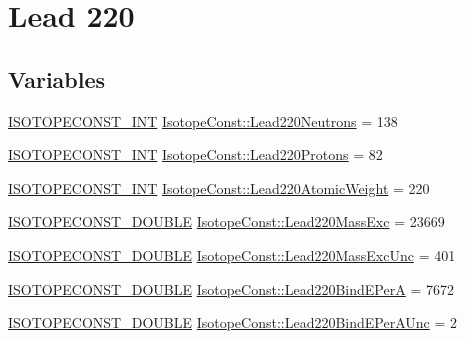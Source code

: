 \hypertarget{group___isotope_const-_lead-_pb220}{}\section{Lead 220}
\label{group___isotope_const-_lead-_pb220}
\subsection*{Variables}
\begin{DoxyCompactItemize}
\item 
\mbox{\hyperlink{group___isotope_const-_macros_ga5f18360b3e99483a35c32d789e62621c}{I\+S\+O\+T\+O\+P\+E\+C\+O\+N\+S\+T\+\_\+\+I\+NT}} \mbox{\hyperlink{group___isotope_const-_lead-_pb220_gae9c7e654f02408f6508fe747a081cbbb}{Isotope\+Const\+::\+Lead220\+Neutrons}} = 138
\item 
\mbox{\hyperlink{group___isotope_const-_macros_ga5f18360b3e99483a35c32d789e62621c}{I\+S\+O\+T\+O\+P\+E\+C\+O\+N\+S\+T\+\_\+\+I\+NT}} \mbox{\hyperlink{group___isotope_const-_lead-_pb220_ga0b3c0adc6d6d3987992f385495edb90f}{Isotope\+Const\+::\+Lead220\+Protons}} = 82
\item 
\mbox{\hyperlink{group___isotope_const-_macros_ga5f18360b3e99483a35c32d789e62621c}{I\+S\+O\+T\+O\+P\+E\+C\+O\+N\+S\+T\+\_\+\+I\+NT}} \mbox{\hyperlink{group___isotope_const-_lead-_pb220_ga8ca47f87e83d5139afb126f253a26346}{Isotope\+Const\+::\+Lead220\+Atomic\+Weight}} = 220
\item 
\mbox{\hyperlink{group___isotope_const-_macros_ga8f45a7272ce02c0b4c65c44636ed719a}{I\+S\+O\+T\+O\+P\+E\+C\+O\+N\+S\+T\+\_\+\+D\+O\+U\+B\+LE}} \mbox{\hyperlink{group___isotope_const-_lead-_pb220_ga68f1703be32ec467b8c35fdfec5ad4c2}{Isotope\+Const\+::\+Lead220\+Mass\+Exc}} = 23669
\item 
\mbox{\hyperlink{group___isotope_const-_macros_ga8f45a7272ce02c0b4c65c44636ed719a}{I\+S\+O\+T\+O\+P\+E\+C\+O\+N\+S\+T\+\_\+\+D\+O\+U\+B\+LE}} \mbox{\hyperlink{group___isotope_const-_lead-_pb220_gadf76aa2ec877c5730400b29593669d18}{Isotope\+Const\+::\+Lead220\+Mass\+Exc\+Unc}} = 401
\item 
\mbox{\hyperlink{group___isotope_const-_macros_ga8f45a7272ce02c0b4c65c44636ed719a}{I\+S\+O\+T\+O\+P\+E\+C\+O\+N\+S\+T\+\_\+\+D\+O\+U\+B\+LE}} \mbox{\hyperlink{group___isotope_const-_lead-_pb220_gafe3bbb2109dd1358b146306f2018d6b9}{Isotope\+Const\+::\+Lead220\+Bind\+E\+PerA}} = 7672
\item 
\mbox{\hyperlink{group___isotope_const-_macros_ga8f45a7272ce02c0b4c65c44636ed719a}{I\+S\+O\+T\+O\+P\+E\+C\+O\+N\+S\+T\+\_\+\+D\+O\+U\+B\+LE}} \mbox{\hyperlink{group___isotope_const-_lead-_pb220_ga2c2cce03a5e3f971791f28088dd6b78a}{Isotope\+Const\+::\+Lead220\+Bind\+E\+Per\+A\+Unc}} = 2

\end{DoxyCompactItemize}
